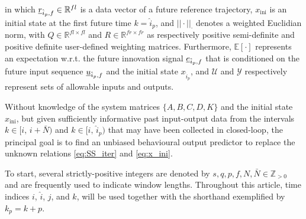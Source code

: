 in which $\underline{r}_{\hat{i}_p,f}\in\mathbb{R}^{fl}$ is a data vector of a future reference trajectory, $x_\mathrm{ini}$ is an initial state at the first future time $k=\hat{i}_p$, and $||\cdot||_\cdot$ denotes a weighted Euclidian norm, with $Q\in\mathbb{R}^{fl\times fl}$ and $R\in\mathbb{R}^{fr\times fr}$ as respectively positive semi-definite and positive definite user-defined weighting matrices. Furthermore, $\mathbb{E}[\cdot]$ represents an expectation w.r.t. the future innovation signal $\underline{e}_{\hat{i}_p,f}$ that is conditioned on the future input sequence $\underline{u}_{\hat{i}_p,f}$ and the initial state $x_{\hat{i}_p}$, and $\mathcal{U}$ and $\mathcal{Y}$ respectively represent sets of allowable inputs and outputs.

Without knowledge of the system matrices $\{A,B,C,D,K\}$ and the initial state $x_\mathrm{ini}$, but given sufficiently informative past input-output data from the intervals $k\in[i,\,i+\bar{N})$ and $k\in[\hat{i},\,\hat{i}_p)$ that may have been collected in closed-loop, the principal goal is to find an unbiased behavioural output predictor to replace the unknown relations \eqref{eq:SS_iter} and \eqref{eq:x_ini}.

To start, several strictly-positive integers are denoted by $s,q,p,f,N,\bar{N}\in\mathbb{Z}_{>0}$ and are frequently used to indicate window lengths. Throughout this article, time indices $i$, $\hat{i}$, $j$, and $k$, will be used together with the shorthand exemplified by $k_p=k+p$.